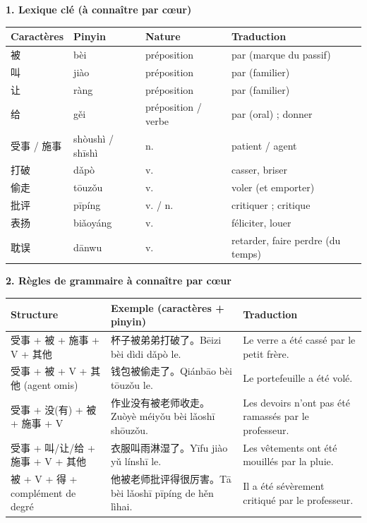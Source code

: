 \documentclass[11pt]{article}
\begin{document}
\begin{bilan}
\textbf{1. Lexique clé (à connaître par cœur)}
\begin{center}
\begin{tabularx}{\linewidth}{|X|X|X|X|}
\hline
\rowcolor{popblueL} Caractères & Pinyin & Nature & Traduction \\
\hline
被 & bèi & préposition & par (marque du passif) \\
\hline
叫 & jiào & préposition & par (familier) \\
\hline
让 & ràng & préposition & par (familier) \\
\hline
给 & gěi & préposition / verbe & par (oral) ; donner \\
\hline
受事 / 施事 & shòushì / shīshì & n. & patient / agent \\
\hline
打破 & dǎpò & v. & casser, briser \\
\hline
偷走 & tōuzǒu & v. & voler (et emporter) \\
\hline
批评 & pīpíng & v. / n. & critiquer ; critique \\
\hline
表扬 & biǎoyáng & v. & féliciter, louer \\
\hline
耽误 & dānwu & v. & retarder, faire perdre (du temps) \\
\hline
\end{tabularx}
\end{center}

\textbf{2. Règles de grammaire à connaître par cœur}
\begin{center}
\begin{tabularx}{\linewidth}{|X|X|X|}
\hline
\rowcolor{popblueL} Structure & Exemple (caractères + pinyin) & Traduction \\
\hline
受事 + 被 + 施事 + V + 其他 & 杯子被弟弟打破了。Bēizi bèi dìdi dǎpò le. & Le verre a été cassé par le petit frère. \\
\hline
受事 + 被 + V + 其他 (agent omis) & 钱包被偷走了。Qiánbāo bèi tōuzǒu le. & Le portefeuille a été volé. \\
\hline
受事 + 没(有) + 被 + 施事 + V & 作业没有被老师收走。Zuòyè méiyǒu bèi lǎoshī shōuzǒu. & Les devoirs n'ont pas été ramassés par le professeur. \\
\hline
受事 + 叫/让/给 + 施事 + V + 其他 & 衣服叫雨淋湿了。Yīfu jiào yǔ línshī le. & Les vêtements ont été mouillés par la pluie. \\
\hline
被 + V + 得 + complément de degré & 他被老师批评得很厉害。Tā bèi lǎoshī pīpíng de hěn lìhai. & Il a été sévèrement critiqué par le professeur. \\
\hline
\end{tabularx}
\end{center}


\end{bilan}
\end{document}
